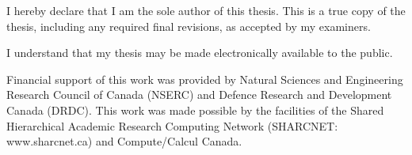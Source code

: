 \begin{declaration}
    \noindent
    I hereby declare that I am the sole author of this thesis. This is a true copy of the thesis, including any required final revisions, as accepted by my examiners.

    \bigskip

    \noindent
    I understand that my thesis may be made electronically available to the public.
\end{declaration}
\begin{abstract}
    This is a short brochure on how to write your thesis by using this \LaTeX{} template. It's easy, efficient and straightforward. What you need to do, no matter you are familiar with \LaTeX{} or not, is to have a try.
\end{abstract}
\begin{acknowledgements}
Financial support of this work was provided by Natural Sciences and Engineering Research Council of Canada (NSERC) and Defence Research and Development Canada (DRDC). This work was made possible by the facilities of the Shared Hierarchical Academic Research Computing Network (SHARCNET: www.sharcnet.ca) and Compute/Calcul Canada.
\end{acknowledgements}
